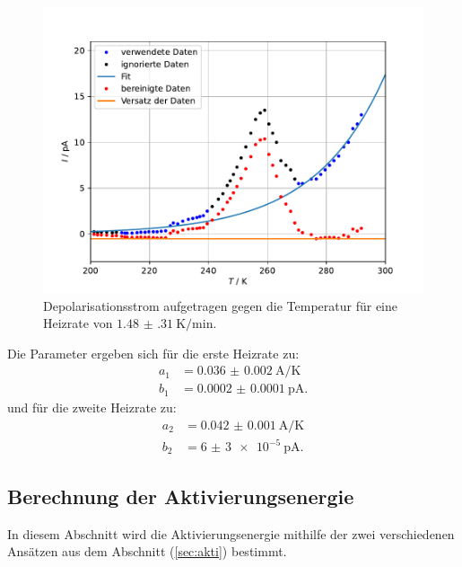 \begin{figure}[h!]
  \centering
  \includegraphics[scale=0.8]{fig/plot2.pdf}
  \caption{Depolarisationsstrom aufgetragen gegen die Temperatur für eine Heizrate von $\SI{1.48(31)}{\kelvin\per\minute}$.}
  \label{fig:2}
\end{figure}
\FloatBarrier
Die Parameter ergeben sich für die erste Heizrate zu:
\begin{align*}
    a_\mathrm{1} &= \SI{0.036(2)}{\ampere\per\kelvin} \\
    b_\mathrm{1} &= \SI{0.0002(1)}{\pico\ampere}.
\end{align*}
und für die zweite Heizrate zu:
\begin{align*}
    a_\mathrm{2} &= \SI{0.042(1)}{\ampere\per\kelvin} \\
    b_\mathrm{2} &= \SI{6(3)e-5}{\pico\ampere}.
\end{align*}
\subsection{Berechnung der Aktivierungsenergie}
In diesem Abschnitt wird die Aktivierungsenergie mithilfe der zwei verschiedenen Ansätzen aus dem Abschnitt (\ref{sec:akti}) bestimmt.
